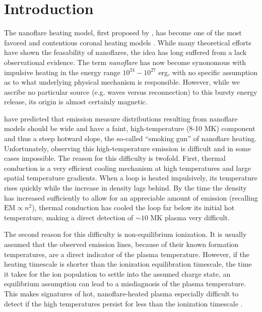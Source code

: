 \documentclass[apj]{emulateapj}
\begin{document}
	\section{Introduction}
	\label{sec:intro}
	\par The nanoflare heating model, first proposed by \citet{parker_nanoflares_1988}, has become one of the most favored and contentious coronal heating models \citep{cargill_implications_1994,cargill_nanoflare_2004,klimchuk_solving_2006}. While many theoretical efforts \citep[e.g.][]{bradshaw_diagnosing_2012,reep_diagnosing_2013,cargill_active_2014} have shown the feasability of nanoflares, the idea has long suffered from a lack observational evidence. The term \textit{nanoflare} has now become synonomous with impulsive heating in the energy range $10^{24}-10^{27}$ erg, with no specific assumption as to what underlying physical mechanism is responsible. However, while we ascribe no particular source (e.g. waves versus reconnection) to this bursty energy release, its origin is almost certainly magnetic.
	\par \citet{cargill_implications_1994,cargill_nanoflare_2004} have predicted that emission measure distributions resulting from nanoflare models should be wide and have a faint, high-temperature (8-10 MK) component and thus a steep hotward slope, the so-called ``smoking gun'' of nanoflare heating. Unfortunately, observing this high-temperature emission is difficult and in some cases impossible. The reason for this difficulty is twofold. First, thermal conduction is a very efficient cooling mechanism at high temperatures and large spatial temperature gradients. When a loop is heated impulsively, its temperature rises quickly while the increase in density lags behind. By the time the density has increased sufficiently to allow for an appreciable amount of emission (recalling $\mathrm{EM}\propto n^2$), thermal conduction has cooled the loop far below its initial hot temperature, making a direct detection of $\sim10$ MK plasma very difficult. 
	\par The second reason for this difficulty is non-equilibrium ionization. It is usually assumed that the observed emission lines, because of their known formation temperatures, are a direct indicator of the plasma temperature. However, if the heating timescale is shorter than the ionization equilibration timescale, the time it takes for the ion population to settle into the assumed charge state, an equilibrium assumption can lead to a misdiagnosis of the plasma temperature. This makes signatures of hot, nanoflare-heated plasma especially difficult to detect if the high temperatures persist for less than the ionization timescale \citep{bradshaw_explosive_2006,bradshaw_what_2011,reale_nonequilibrium_2008}.
\end{document}
